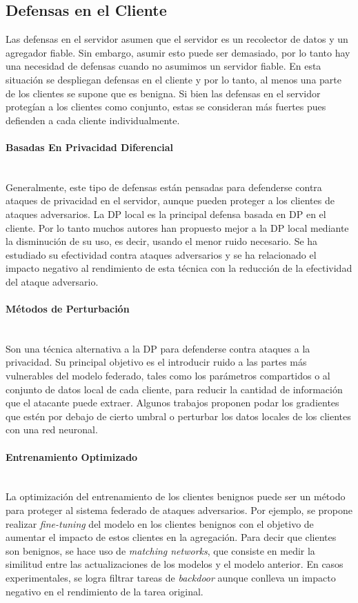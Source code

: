 \subsection{Defensas en el Cliente}
Las defensas en el servidor asumen que el servidor es un recolector de datos y un agregador fiable. Sin embargo, asumir esto puede ser demasiado, por lo tanto hay una necesidad de defensas cuando no asumimos un servidor fiable. En esta situación se despliegan defensas en el cliente y por lo tanto, al menos una parte de los clientes se supone que es benigna. Si bien las defensas en el servidor protegían a los clientes como conjunto, estas se consideran más fuertes pues defienden a cada cliente individualmente.

\paragraph{Basadas En Privacidad Diferencial}\label{sec:fldp}\mbox{}\\
Generalmente, este tipo de defensas están pensadas para defenderse contra ataques de privacidad en el servidor, aunque pueden proteger a los clientes de ataques adversarios. La \ac{DP} local es la principal defensa basada en \ac{DP} en el cliente. Por lo tanto muchos autores han propuesto mejor a la \ac{DP} local mediante la disminución de su uso, es decir, usando el menor ruido necesario. Se ha estudiado su efectividad contra ataques adversarios y se ha relacionado el impacto negativo al rendimiento de esta técnica con la reducción de la efectividad del ataque adversario.


\paragraph{Métodos de Perturbación}\mbox{}\\
Son una técnica alternativa a la \ac{DP} para defenderse contra ataques a la privacidad. Su principal objetivo es el introducir ruido a las partes más vulnerables del modelo federado, tales como los parámetros compartidos o al conjunto de datos local de cada cliente, para reducir la cantidad de información que el atacante puede extraer. Algunos trabajos proponen podar los gradientes que estén por debajo de cierto umbral o perturbar los datos locales de los clientes con una red neuronal.

\paragraph{Entrenamiento Optimizado}\mbox{}\\
La optimización del entrenamiento de los clientes benignos puede ser un método para proteger al sistema federado de ataques adversarios. Por ejemplo, se propone realizar \textit{fine-tuning} del modelo en los clientes benignos con el objetivo de aumentar el impacto de estos clientes en la agregación. Para decir que clientes son benignos, se hace uso de \textit{matching networks}, que consiste en medir la similitud entre las actualizaciones de los modelos y el modelo anterior. En casos experimentales, se logra filtrar tareas de \textit{backdoor} aunque conlleva un impacto negativo en el rendimiento de la tarea original.

